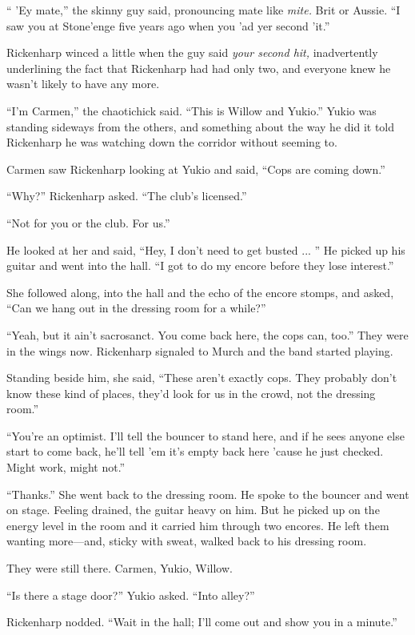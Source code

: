 `` 'Ey mate,'' the skinny guy said, pronouncing mate like \textit{mite.} Brit or Aussie. ``I saw you at Stone'enge five years ago when you 'ad yer second 'it.''

Rickenharp winced a little when the guy said \textit{your second hit,} inadvertently underlining the fact that Rickenharp had had only two, and everyone knew he wasn't likely to have any more.

``I'm Carmen,'' the chaotichick said. ``This is Willow and Yukio.'' Yukio was standing sideways from the others, and something about the way he did it told Rickenharp he was watching down the corridor without seeming to.

Carmen saw Rickenharp looking at Yukio and said, ``Cops are coming down.''

``Why?'' Rickenharp asked. ``The club's licensed.''

``Not for you or the club. For us.''

He looked at her and said, ``Hey, I don't need to get busted ... '' He picked up his guitar and went into the hall. ``I got to do my encore before they lose interest.''

She followed along, into the hall and the echo of the encore stomps, and asked, ``Can we hang out in the dressing room for a while?''

``Yeah, but it ain't sacrosanct. You come back here, the cops can, too.'' They were in the wings now. Rickenharp signaled to Murch and the band started playing.

Standing beside him, she said, ``These aren't exactly cops. They probably don't know these kind of places, they'd look for us in the crowd, not the dressing room.''

``You're an optimist. I'll tell the bouncer to stand here, and if he sees anyone else start to come back, he'll tell 'em it's empty back here 'cause he just checked. Might work, might not.''

``Thanks.'' She went back to the dressing room. He spoke to the bouncer and went on stage. Feeling drained, the guitar heavy on him. But he picked up on the energy level in the room and it carried him through two encores. He left them wanting more---and, sticky with sweat, walked back to his dressing room.

They were still there. Carmen, Yukio, Willow.

``Is there a stage door?'' Yukio asked. ``Into alley?''

Rickenharp nodded. ``Wait in the hall; I'll come out and show you in a minute.''

